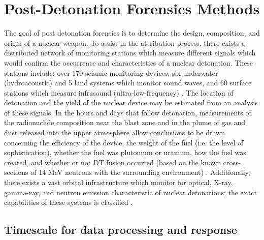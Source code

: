 \documentclass{report}
\begin{document}
\section{Post-Detonation Forensics Methods}


The goal of post detonation forensics is to determine the design, composition, and origin of a nuclear weapon. To assist in the attribution process, there exists a distributed network of monitoring stations which measure different signals which would confirm the occurrence and characteristics of a nuclear detonation. These stations include: over 170 seismic monitoring devices, six underwater (hydroacoustic) and 5 land systems which monitor sound waves, and 60 surface stations which measure infrasound (ultra-low-frequency) \cite{Lane2012}. The location of detonation and the yield of the nuclear device may be estimated from an analysis of these signals. In the hours and days that follow detonation, measurements of the radionuclide composition near the blast zone and in the plume of gas and dust released into the upper atmosphere allow conclusions to be drawn concerning the efficiency of the device, the weight of the fuel (i.e. the level of sophistication), whether the fuel was plutonium or uranium, how the fuel was created, and whether or not DT fusion occurred (based on the known cross-sections of 14 MeV neutrons with the surrounding environment) \cite{Davis2011}. Additionally, there exists a vast orbital infrastructure which monitor for optical, X-ray, gamma-ray, and neutron emission characteristic of nuclear detonations; the exact capabilities of these systems is classified \cite{1446400}. 

\subsection{Timescale for data processing and response}
\end{document}
